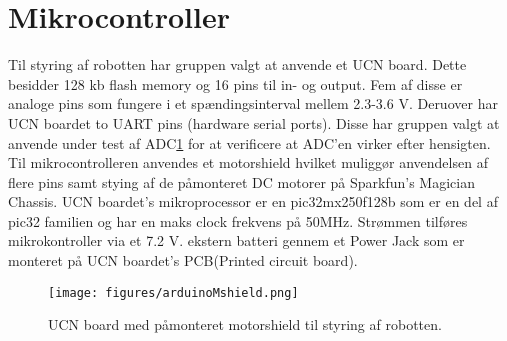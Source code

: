 \section{Mikrocontroller}
\label{ref_adc}
Til  styring af robotten har gruppen valgt at anvende et UCN board. Dette besidder 128 kb flash memory og 16 pins til in- og output. Fem af disse er analoge pins som fungere i et spændingsinterval mellem 2.3-3.6 V. 
\newline
Deruover har UCN boardet to UART pins (hardware serial ports). Disse har gruppen valgt at anvende under test af ADC\ref{ref_adc} for at verificere at ADC'en virker efter hensigten. 
Til mikrocontrolleren anvendes et motorshield hvilket muliggør anvendelsen af flere pins samt stying af de påmonteret DC motorer på Sparkfun's Magician Chassis.
\newline 
UCN boardet's mikroprocessor er en pic32mx250f128b som er en del af pic32 familien og har en maks clock frekvens på 50MHz. 
Strømmen tilføres mikrokontroller via et 7.2 V. ekstern batteri gennem et Power Jack som er monteret på UCN boardet's PCB(Printed circuit board). 

\begin{figure}[h!]
  \centering
  \texttt{[image: figures/arduinoMshield.png]}
  \caption{UCN board med påmonteret motorshield til styring af robotten.}
  \label{arduino&shield}
\end{figure}

\newpage
